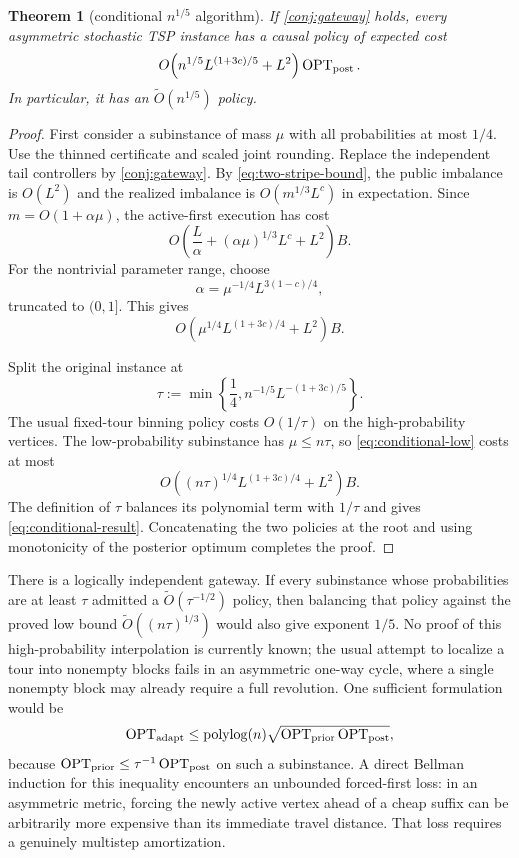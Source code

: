 \documentclass[11pt]{article}
\newtheorem{theorem}{Theorem}[section]
\theoremstyle{remark}
\newcommand{\opt}{\operatorname{OPT}}
\begin{document}
\begin{theorem}[conditional $n^{1/5}$ algorithm]\label{thm:conditional}
If \cref{conj:gateway} holds, every asymmetric stochastic TSP instance has a
causal policy of expected cost
\begin{equation}\label{eq:conditional-result}
 O\!\left(n^{1/5}L^{(1+3c)/5}+L^2\right)\opt_{\rm post}.
\end{equation}
In particular, it has an $\widetilde O(n^{1/5})$ policy.
\end{theorem}

\begin{proof}
First consider a subinstance of mass $\mu$ with all probabilities at most
$1/4$.  Use the thinned certificate and scaled joint rounding.  Replace the
independent tail controllers by \cref{conj:gateway}.  By
\eqref{eq:two-stripe-bound}, the public imbalance is $O(L^2)$ and the
realized imbalance is $O(m^{1/3}L^c)$ in expectation.  Since
$m=O(1+\alpha\mu)$, the active-first execution has cost
\begin{equation}\label{eq:conditional-low-alpha}
 O\!\left(
   \frac L\alpha+(\alpha\mu)^{1/3}L^c+L^2
 \right)B.
\end{equation}
For the nontrivial parameter range, choose
\[
  \alpha=\mu^{-1/4}L^{3(1-c)/4},
\]
truncated to $(0,1]$.  This gives
\begin{equation}\label{eq:conditional-low}
 O\!\left(
   \mu^{1/4}L^{(1+3c)/4}+L^2
 \right)B.
\end{equation}

Split the original instance at
\[
  \tau:=\min\left\{\frac14,
       n^{-1/5}L^{-(1+3c)/5}\right\}.
\]
The usual fixed-tour binning policy costs $O(1/\tau)$ on the
high-probability vertices.  The low-probability subinstance has
$\mu\le n\tau$, so \eqref{eq:conditional-low} costs at most
\[
 O\!\left((n\tau)^{1/4}L^{(1+3c)/4}+L^2\right)B.
\]
The definition of $\tau$ balances its polynomial term with $1/\tau$ and
gives \eqref{eq:conditional-result}.  Concatenating the two policies at the
root and using monotonicity of the posterior optimum completes the proof.
\end{proof}

There is a logically independent gateway.  If every subinstance whose
probabilities are at least $\tau$ admitted a
$\widetilde O(\tau^{-1/2})$ policy, then balancing that policy against the
proved low bound $\widetilde O((n\tau)^{1/3})$ would also give exponent
$1/5$.  No proof of this high-probability interpolation is currently known;
the usual attempt to localize a tour into nonempty blocks fails in an
asymmetric one-way cycle, where a single nonempty block may already require a
full revolution.  One sufficient formulation would be
\[
 \opt_{\rm adapt}
 \le \operatorname{polylog}(n)
       \sqrt{\opt_{\rm prior}\opt_{\rm post}},
\]
because $\opt_{\rm prior}\le\tau^{-1}\opt_{\rm post}$ on such a subinstance.
A direct Bellman induction for this inequality encounters an unbounded
forced-first loss: in an asymmetric metric, forcing the newly active vertex
ahead of a cheap suffix can be arbitrarily more expensive than its immediate
travel distance.  That loss requires a genuinely multistep amortization.
\end{document}
